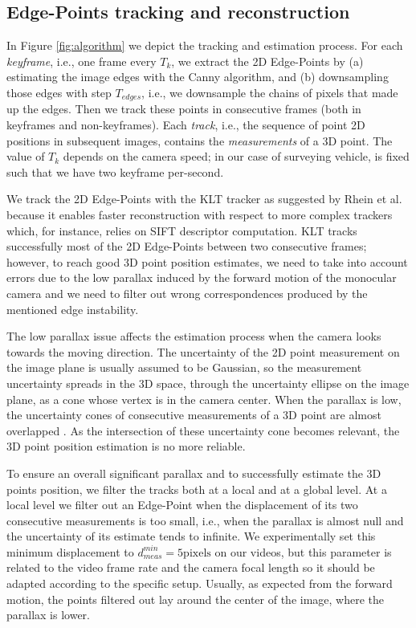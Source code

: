 

\subsection{Edge-Points tracking and reconstruction}
\label{subsubsec:Edge-Point-tracking}
In Figure \ref{fig:algorithm} we depict the tracking and estimation process.
For each \emph{keyframe}, i.e., one frame every $T_k$, we extract the 2D Edge-Points by (a) estimating the image edges with the Canny algorithm, and (b) downsampling those edges with step $T_{edges}$, i.e., we downsample the chains of pixels that made up the edges. 
Then we track these points in consecutive frames (both in keyframes and non-keyframes). Each \emph{track}, i.e., the sequence of point 2D positions in subsequent images, contains the \emph{measurements} of a 3D point. The value of $T_k$ depends on the camera speed; in our case of surveying vehicle, is fixed such that we have two keyframe per-second. 


We track the 2D Edge-Points with the KLT tracker \cite{Lucas_Kanade81} as suggested by Rhein et al. \cite{Rhein_et_al13} because it enables faster reconstruction with respect to more complex trackers which, for instance, relies on SIFT descriptor computation.
KLT tracks successfully most of the 2D Edge-Points between two consecutive frames; however, to reach good 3D point position estimates, we need to take into account errors due to the low parallax induced by the forward motion of the monocular camera and we need to filter out wrong correspondences produced by the mentioned edge instability. 


The low parallax issue affects the estimation process when the camera looks towards the moving direction. The uncertainty of the 2D point measurement on the image plane is usually assumed to be Gaussian, so the measurement uncertainty spreads in the 3D space, through the uncertainty ellipse on the image plane, as a cone whose vertex is in the camera center. 
When the parallax is low, the uncertainty cones of consecutive measurements of a 3D point are almost overlapped \cite{hazi04}. As the intersection of these uncertainty cone becomes relevant, the 3D point position estimation is no more reliable.

To ensure  an overall significant parallax and to successfully estimate the 3D points position, we filter the tracks  both at a local and at a global level.
At a local level we filter out an Edge-Point when the displacement of its two consecutive measurements is too small, i.e., when the parallax is almost null and the uncertainty of its estimate tends to infinite. 
We experimentally set this minimum displacement to $d_{meas}^{min} = 5 \text{pixels}$ on our videos, but this parameter is related to the video frame rate and the camera focal length so it should be adapted according to the specific setup. 
Usually, as expected from the forward motion, the points filtered out lay around the center of the image, where the parallax is lower.

